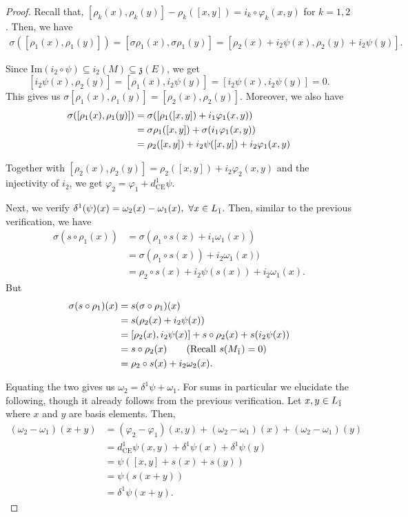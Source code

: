 \documentclass[12pt]{amsart}
\newcommand {\ce}{{\text{CE}}}
\newcommand{\black}{\color{black}}
\begin{document}
\begin{proof}
\vspace{0.5em}

Recall that, $[\rho_k(x),\rho_k(y)]-\rho_k([x,y])=i_k \circ\varphi_k(x,y)$ for $k=1,2$. Then, we have 
\begin{align*}
\sigma([\rho_1(x),\rho_1(y)])=[\sigma\rho_1(x),\sigma\rho_1(y)]=[\rho_2(x)+i_2\psi(x),\rho_2(y)+i_2\psi(y)].
\end{align*}

Since $\mathrm{Im}(i_2\circ\psi) \subseteq i_2(M)\subseteq \mathfrak{z}(E)$, we get  \[
[i_2\psi(x),\rho_2(y)]=[\rho_1(x),i_2\psi(y)]=[i_2\psi(x),i_2\psi(y)]=0.
\]
This gives us $\sigma[\rho_1(x),\rho_1(y)]=[\rho_2(x),\rho_2(y)].$ Moreover, we also have
\begin{align*}
    \sigma([\rho_1(x),\rho_1(y)]) &= \sigma([\rho_1([x,y])+i_1\varphi_1(x,y)) \black\\
    &=\sigma\rho_1([x,y]) + \sigma(i_1\varphi_1(x,y))\\
    &=\rho_2([x,y]) +i_2\psi([x,y]) +i_2\varphi_1(x,y) 
\end{align*}

Together with $[\rho_2(x),\rho_2(y)]=\rho_2([x,y])+i_2\varphi_2(x,y)$ and the injectivity of $i_2$, we get \(\varphi_2=\varphi_1+d^1_{\ce}\psi.\)

\vspace{0.5em}
Next, we verify {$\delta^1(\psi)(x)= \omega_2(x)-\omega_1(x), \ \forall x \in L_{{\bar1}}$}. Then, similar to the previous verification, we have 
\begin{align*}
    \sigma(s \circ \rho_1(x))&=\sigma(\rho_1 \circ s(x) + i_1\omega_1(x))\\
    &=\sigma(\rho_1 \circ s(x)) +i_2\omega_1(x))\\
    &=\rho_2\circ s(x)+i_2\psi(s(x)) + i_2\omega_1(x).
\end{align*}
But
\begin{align*}
\sigma(s\circ \rho_1)(x)&=s(\sigma \circ \rho_1)(x)\\
&=s(\rho_2(x)+i_2\psi(x))\\
&=[\rho_2(x),i_2\psi(x)]+s\circ \rho_2(x) +s(i_2\psi(x))\\
&=s\circ \rho_2(x) \qquad (\mathrm{Recall} \ s(M_{{\bar1}})=0)\\
&=\rho_2 \circ s(x)+i_2\omega_2(x).
\end{align*}

Equating the two gives us $\omega_2 = \delta^1\psi +\omega_1$. For sums in particular we elucidate the following, though it already follows from the previous verification. Let $x,y \in L_{{\bar1}}$ where $x$ and $y$ are basis elements. Then,
\begin{align*}
(\omega_2-\omega_1)(x+y)&=(\varphi_2-\varphi_1)(x,y)+(\omega_2-\omega_1)(x)+(\omega_2-\omega_1)(y)\\
&=d^1_{\ce}\psi(x,y)+\delta^1\psi(x)+\delta^1\psi(y)\\
&=\psi([x,y]+s(x)+s(y))\\
&=\psi(s(x+y))\\
&=\delta^1\psi(x+y).
\end{align*}


\end{proof}
\end{document}
